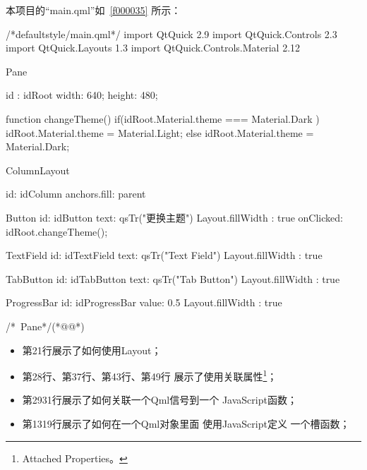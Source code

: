 本项目的“main.qml”如\filesourcenumbernameone\ \ref{f000035}
所示：

\label{f000035}    %
\FloatBarrier                                  %
\begin{thebookfilesourceone}[escapeinside={(*@}{@*)},
caption=GoodLuck,
title=\filesourcenumbernameone \thefilesourcenumber
]
/*defaultstyle/main.qml*/
import QtQuick 2.9
import QtQuick.Controls 2.3
import QtQuick.Layouts 1.3
import QtQuick.Controls.Material 2.12

Pane {

    id : idRoot
    width: 640;
    height: 480;

    function changeTheme(){
        if(idRoot.Material.theme === Material.Dark ){
            idRoot.Material.theme = Material.Light;
        }else{
            idRoot.Material.theme = Material.Dark;
        }
    }

    ColumnLayout {
        id: idColumn
        anchors.fill: parent

        Button {
            id: idButton
            text: qsTr("更换主题")
            Layout.fillWidth : true
            onClicked: {
                idRoot.changeTheme();
            }
        }

        TextField {
            id: idTextField
            text: qsTr("Text Field")
            Layout.fillWidth : true
        }

        TabButton {
            id: idTabButton
            text: qsTr("Tab Button")
            Layout.fillWidth : true
        }

        ProgressBar {
            id: idProgressBar
            value: 0.5
            Layout.fillWidth : true
        }

    }

}/*~Pane*/(*@\marginpar[\hfill\setlength\fboxsep{2pt}\fbox{\footnotesize{\kaishu\parbox{1em}{\setlength{\baselineskip}{2pt}\filesourcenumbernameone}}\footnotesize{\thefilesourcenumber}}]{\setlength\fboxsep{2pt}\fbox{\footnotesize{\kaishu\parbox{1em}{\setlength{\baselineskip}{2pt}\filesourcenumbernameone}}\footnotesize{\thefilesourcenumber}}}@*)\end{thebookfilesourceone}          %
\addtocounter{lstlisting}{-1}   %

\begin{itemize}
\item 第21行展示了如何使用Layout；
\item 第28行、第37行、第43行、第49行
展示了使用关联属性\footnote{
Attached Properties。
}；
\item 第29\raisebox{0.16ex}{\sourcefonttwo\~{}}31行展示了如何关联一个Qml信号到一个
JavaScript函数；%
\item 第13\raisebox{0.16ex}{\sourcefonttwo\~{}}19行展示了如何在一个Qml对象里面
使用JavaScript定义
一个槽函数；
\end{itemize}

